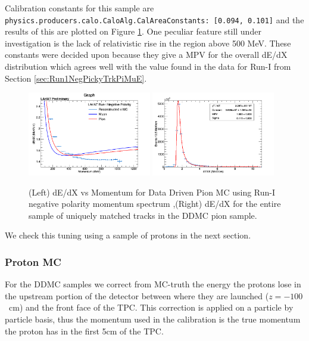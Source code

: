 Calibration constants for this sample are \verb!physics.producers.calo.CaloAlg.CalAreaConstants: [0.094, 0.101]! and the results of this are plotted on Figure \ref{fig:DDMCPionResults}. One peculiar feature still under investigation is the lack of relativistic rise in the region above 500 MeV. These constants were decided upon because they give a MPV for the overall dE/dX distribution which agrees well with the value found in the data for Run-I from Section \ref{sec:Run1NegPickyTrkPiMuE}.

\begin{figure}[htb]
\centering
\includegraphics[width=0.48\textwidth]{images/dEdXvsMomentumPionMCVeryFineBin.png}
\includegraphics[width=0.48\textwidth]{images/dEdXDDMCPionRunI.png}
\caption{(Left) dE/dX vs Momentum for Data Driven Pion MC using Run-I negative polarity momentum spectrum ,(Right) dE/dX for the entire sample of uniquely matched tracks in the DDMC pion sample.}
\label{fig:DDMCPionResults}
\end{figure}

We check this tuning using a sample of protons in the next section.

\subsubsection{Proton MC}\label{sec:Proton MC}

For the DDMC samples we correct from MC-truth the energy the protons lose in the upstream portion of the detector between where they are launched ($z=-100$~cm) and the front face of the TPC. This correction is applied on a particle by particle basis, thus the momentum used in the calibration is the true momentum the proton has in the first 5cm of the TPC.

